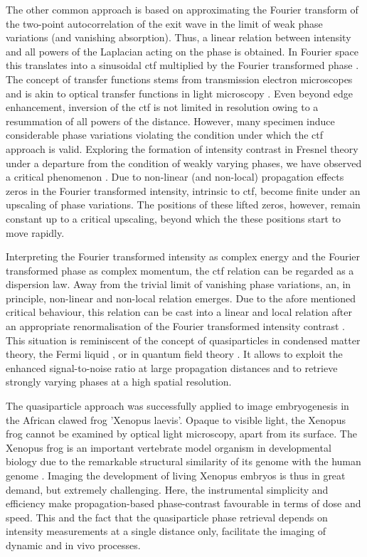 \documentclass[
twoside,
openright,
titlepage,
numbers=noenddot,
headinclude,
fleqn,
a4paper,
footinclude=true,
cleardoublepage=empty,
abstractoff,
BCOR=5mm,
paper=a4,
fontsize=11pt,
british,ngerman,american,
]{scrreprt}
\begin{document}
The other common approach is based on approximating the Fourier
transform of the two-point autocorrelation of the exit wave in the
limit of weak phase variations (and vanishing absorption).  Thus, a
linear relation between intensity and all powers of the Laplacian
acting on the phase is obtained.  In Fourier space this translates
into a sinusoidal \acl{ctf} multiplied by the Fourier transformed
phase \cite{Guigay1977,Guigay1978,Papoulis1974}.  The concept of
transfer functions stems from transmission electron microscopes
\cite{Kirkland1998} and is akin to optical transfer functions in light
microscopy \cite{Streibl1985}.  Even beyond edge enhancement,
inversion of the \acf{ctf} is not limited in resolution owing to a
resummation of all powers of the distance.  However, many specimen
induce considerable phase variations violating the condition under
which the \ac{ctf} approach is valid.  Exploring the formation of
intensity contrast in Fresnel theory under a departure from the
condition of weakly varying phases, we have observed a critical
phenomenon \cite{Moosmann2011opex}.  Due to non-linear (and non-local)
propagation effects zeros in the Fourier transformed intensity,
intrinsic to \ac{ctf}, become finite under an upscaling of phase
variations.  The positions of these lifted zeros, however, remain
constant up to a critical upscaling, beyond which the these positions
start to move rapidly.

Interpreting the Fourier transformed intensity as complex energy and
the Fourier transformed phase as complex momentum, the \ac{ctf}
relation can be regarded as a dispersion law.  Away from the trivial
limit of vanishing phase variations, an, in principle, non-linear and
non-local relation emerges. Due to the afore mentioned critical
behaviour, this relation can be cast into a linear and local relation
after an appropriate renormalisation of the Fourier transformed
intensity contrast \cite{Hofmann2011opex}.  This situation is
reminiscent of the concept of quasiparticles in condensed matter
theory, \eg{} the Fermi liquid \cite{Landau1957}, or in quantum field
theory \cite{HofmannBook}.  It allows to exploit the enhanced
signal-to-noise ratio at large propagation distances and to retrieve
strongly varying phases at a high spatial resolution.

The quasiparticle approach was successfully applied to image
embryogenesis in the African clawed frog 'Xenopus laevis'.  Opaque to
visible light, the Xenopus frog cannot be examined by optical light
microscopy, apart from its surface.  The Xenopus frog is an important
vertebrate model organism in developmental biology due to the
remarkable structural similarity of its genome with the human genome
\cite{Hellsten2010}.  Imaging the development of living Xenopus
embryos is thus in great demand, but extremely challenging.  Here, the
instrumental simplicity and efficiency make propagation-based
phase-contrast favourable in terms of dose and speed.  This and the
fact that the quasiparticle phase retrieval depends on intensity
measurements at a single distance only, facilitate the imaging of
dynamic and in vivo processes.
\end{document}

